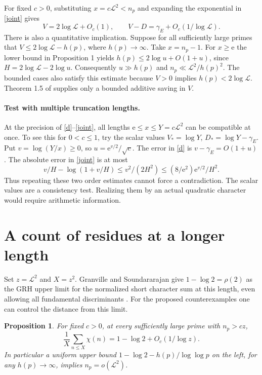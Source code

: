 \documentclass[11pt]{article}
\newtheorem{proposition}{Proposition}
\newcommand{\LL}{\mathcal L}
\newcommand{\e}{\mathrm e}
\begin{document}
For fixed $c>0$, substituting $x=c\LL^2<n_p$ and expanding the
exponential in \eqref{joint} gives
\[
 V=2\log\LL+O_c(1),\qquad
 V-D=\gamma_E+O_c(1/\log\LL).
\]
There is also a quantitative implication. Suppose for all sufficiently
large primes that $V\le 2\log\LL-h(p)$, where $h(p)\to\infty$.
Take $x=n_p-1$. For $x\ge\e$ the lower bound in Proposition 1 yields
$h(p)\le 2\log u+O(1+u)$, since $H=2\log\LL-2\log u$.
Consequently $u\gg h(p)$ and $n_p\ll\LL^2/h(p)^2$. The bounded
cases also satisfy this estimate because $V>0$ implies $h(p)<2\log\LL$.
Theorem 1.5 of \cite{lls} supplies only a bounded additive saving in $V$.

\paragraph{Test with multiple truncation lengths.}
At the precision of \eqref{d}--\eqref{joint}, all lengths
$\e\le x\le Y=c\LL^2$ can be compatible at once. To see this for
$0<c\le1$, try the scalar values $V_*=\log Y$, $D_*=\log Y-\gamma_E$.
Put $v=\log(Y/x)\ge0$, so $u=\e^{v/2}/\sqrt c$.
The error in \eqref{d} is $v-\gamma_E=O(1+u)$. The absolute error
in \eqref{joint} is at most
\[
 v/H-\log(1+v/H)\le v^2/(2H^2)\le (8/\e^2)\e^{v/2}/H^2 .
\]
Thus repeating these two order estimates cannot force a contradiction.
The scalar values are a consistency test. Realizing them by an actual
quadratic character would require arithmetic information.

\section{A count of residues at a longer length}
Set $z=\LL^2$ and $X=z^2$. Granville and Soundararajan give
$1-\log 2=\rho(2)$ as the GRH upper limit for the normalized short
character sum at this length, even allowing all fundamental discriminants
\cite[Theorem 2 and the discussion of $\alpha(B)$]{gs}. For the proposed
counterexamples one can control the distance from this limit.

\begin{proposition}
For fixed $c>0$, at every sufficiently large prime with $n_p>cz$,
\[
 \frac{1}{X}\sum_{n\le X}\chi(n)
 =1-\log 2+O_c(1/\log z).
\]
In particular a uniform upper bound $1-\log 2-h(p)/\log\log p$ on
the left, for any $h(p)\to\infty$, implies $n_p=o(\LL^2)$.
\end{proposition}
\end{document}

